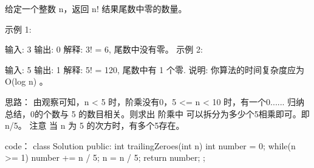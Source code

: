 给定一个整数 n，返回 n! 结果尾数中零的数量。

示例 1:

输入: 3
输出: 0
解释: 3! = 6, 尾数中没有零。
示例 2:

输入: 5
输出: 1
解释: 5! = 120, 尾数中有 1 个零.
说明: 你算法的时间复杂度应为 O(log n) 。



















思路：
由观察可知，n < 5 时，阶乘没有0，5 <= n < 10 时，有一个0...... 归纳总结，0的个数与 5 的数目相关。则求出 阶乘中 可以拆分为多少个5相乘即可。即 n/5。
注意 当 n 为 5 的次方时，有多个5存在。












code：
class Solution {
public:
    int trailingZeroes(int n) {
        int number = 0;
        while(n >= 1)
        {
            number += n / 5;
            n = n / 5;
        }
        return number;
    }
};